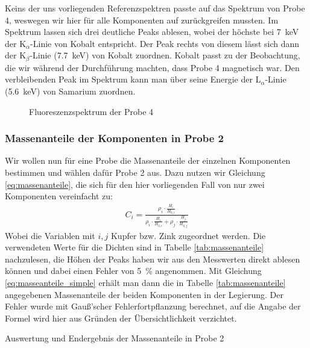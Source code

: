 \documentclass[11pt, a4paper]{article}
\begin{document}
Keins der uns vorliegenden Referenzspektren passte auf das Spektrum von Probe 4, weswegen wir hier für alle Komponenten auf \cite{booklet} zurückgreifen mussten.
Im Spektrum lassen sich drei deutliche Peaks ablesen, wobei der höchste bei \SI{7}{\kilo\electronvolt} der K$_{\alpha}$-Linie von Kobalt entspricht.
Der Peak rechts von diesem lässt sich dann der K$_{\beta}$-Linie (\SI{7.7}{\kilo\electronvolt}) von Kobalt zuordnen.
Kobalt passt zu der Beobachtung, die wir während der Durchführung machten, dass Probe 4 magnetisch war.
Den verbleibenden Peak im Spektrum kann man über seine Energie der L$_{\alpha}$-Linie (\SI{5.6}{\kilo\electronvolt}) von Samarium zuordnen. 

\begin{figure}[!h]
\centering

\caption{Fluoreszenzspektrum der Probe 4}
\label{fig:probe4}
\end{figure}

\subsubsection{Massenanteile der Komponenten in Probe 2}

Wir wollen nun für eine Probe die Massenanteile der einzelnen Komponenten bestimmen und wählen dafür Probe 2 aus.
Dazu nutzen wir Gleichung \ref{eq:massenanteile}, die sich für den hier vorliegenden Fall von nur zwei Komponenten vereinfacht zu:
\begin{align}
C_i = \frac{\rho_i \cdot \frac{H_i}{H_{0,i}}}{\rho_i \cdot \frac{H_i}{H_{0,i}}+\rho_j \cdot \frac{H_j}{H_{0,j}}}
\label{eq:masseanteile_simple}
\end{align}
Wobei die Variablen mit $i, j$ Kupfer bzw. Zink zugeordnet werden.
Die verwendeten Werte für die Dichten sind in Tabelle \ref{tab:massenanteile} nachzulesen, die Höhen der Peaks haben wir aus den Messwerten direkt ablesen können und dabei einen Fehler von \SI{5}{\percent} angenommen.
Mit Gleichung \ref{eq:masseanteile_simple} erhält man dann die in Tabelle \ref{tab:massenanteile} angegebenen Massenanteile der beiden Komponenten in der Legierung.
Der Fehler wurde mit Gauß'scher Fehlerfortpflanzung berechnet, auf die Angabe der Formel wird hier aus Gründen der Übersichtlichkeit verzichtet.

\begin{table}[h]
\centering

\caption{Auswertung und Endergebnis der Massenanteile in Probe 2}
\label{tab:massenanteile}
\end{table}
\end{document}
